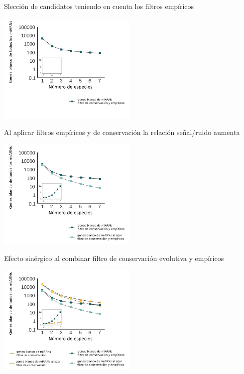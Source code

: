 \documentclass{beamer}
\begin{document}
\begin{frame}{Slección de candidatos teniendo en cuenta los filtros empíricos}
	\begin{center}
		\includegraphics[width=0.5\textwidth]{img/NAR_fig2_03.png}
	\end{center}
\end{frame}

\begin{frame}{Al aplicar filtros empíricos y de conservación la relación señal/ruido aumenta}
	\begin{center}
		\includegraphics[width=0.5\textwidth]{img/NAR_fig2_04.png}
	\end{center}
\end{frame}

\begin{frame}{Efecto sinérgico al combinar filtro de conservación evolutiva y empíricos}
	\begin{center}
		\includegraphics[width=0.5\textwidth]{img/NAR_fig2_05.png}
	\end{center}
\end{frame}
\end{document}
